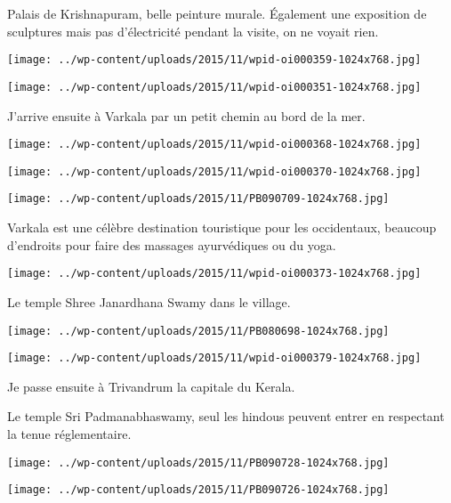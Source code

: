  Palais de Krishnapuram, belle peinture murale. Également une exposition de sculptures mais pas d'électricité pendant la visite, on ne voyait rien. 
\begin{center} \texttt{[image: ../wp-content/uploads/2015/11/wpid-oi000359-1024x768.jpg]} \end{center}
\begin{center} \texttt{[image: ../wp-content/uploads/2015/11/wpid-oi000351-1024x768.jpg]} \end{center}

 J'arrive ensuite à Varkala par un petit chemin au bord de la mer. 
\begin{center} \texttt{[image: ../wp-content/uploads/2015/11/wpid-oi000368-1024x768.jpg]} \end{center}
\begin{center} \texttt{[image: ../wp-content/uploads/2015/11/wpid-oi000370-1024x768.jpg]} \end{center}
\begin{center} \texttt{[image: ../wp-content/uploads/2015/11/PB090709-1024x768.jpg]} \end{center}

\pagebreak
 Varkala est une célèbre destination touristique pour les occidentaux, beaucoup d'endroits pour faire des massages ayurvédiques ou du yoga. 
\begin{center} \texttt{[image: ../wp-content/uploads/2015/11/wpid-oi000373-1024x768.jpg]} \end{center}

 Le temple Shree Janardhana Swamy dans le village. 
\begin{center} \texttt{[image: ../wp-content/uploads/2015/11/PB080698-1024x768.jpg]} \end{center}
\begin{center} \texttt{[image: ../wp-content/uploads/2015/11/wpid-oi000379-1024x768.jpg]} \end{center}

 Je passe ensuite à Trivandrum la capitale du Kerala. 

 Le temple Sri Padmanabhaswamy, seul les hindous peuvent entrer en respectant la tenue réglementaire. 
\begin{center} \texttt{[image: ../wp-content/uploads/2015/11/PB090728-1024x768.jpg]} \end{center}
\begin{center} \texttt{[image: ../wp-content/uploads/2015/11/PB090726-1024x768.jpg]} \end{center}

